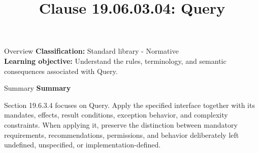 \documentclass[10pt,letterpaper]{article}
\title{Clause 19.06.03.04: Query}
\author{}
\date{}
\begin{document}
\maketitle
\begin{CornellOverviewBox}{Overview}
\textbf{Classification:} Standard library - Normative\\[2pt]
\textbf{Learning objective:} Understand the rules, terminology, and semantic consequences associated with Query.
\end{CornellOverviewBox}\begin{CornellSummaryBox}{Summary}
{\sffamily\bfseries\color{Accent} Summary}\par\vspace{3pt}Section 19.6.3.4 focuses on Query. Apply the specified interface together with its mandates, effects, result conditions, exception behavior, and complexity constraints. When applying it, preserve the distinction between mandatory requirements, recommendations, permissions, and behavior deliberately left undefined, unspecified, or implementation-defined.
\end{CornellSummaryBox}
\end{document}
